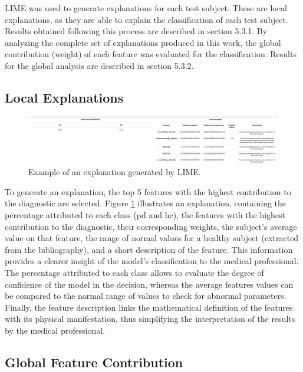 LIME was used to generate explanations for each test subject. These are local explanations, as they are able to explain the classification of each test subject. Results obtained following this process are described in section 5.3.1. By analyzing the complete set of explanations produced in this work, the global contribution (weight) of each feature was evaluated for the classification. Results for the global analysis are described in section 5.3.2.

\subsection{Local Explanations}

\begin{figure}[t]
	\begin{center}
		\includegraphics[clip=true, width=\textwidth]{figs/example_explanation.png}
	\end{center}
	\caption{Example of an explanation generated by LIME.}
	\label{explanation}
\end{figure}

To generate an explanation, the top 5 features with the highest contribution to the diagnostic are selected. Figure \ref{explanation} illustrates an explanation, containing the percentage attributed to each class (\gls{pd} and \gls{hc}), the features with the highest contribution to the diagnostic, their corresponding weights, the subject's average value on that feature, the range of normal values for a healthy subject (extracted from the bibliography), and a short description of the feature. This information provides a clearer insight of the model's
classification to the medical professional. The percentage attributed to each class allows to evaluate the degree of confidence of the model in the decision, whereas the average features values can be compared to the normal range of values to check for abnormal parameters. Finally, the feature description links the mathematical definition of the features with its physical manifestation, thus simplifying the interpretation of the results by the medical professional. 

\subsection{Global Feature Contribution}


